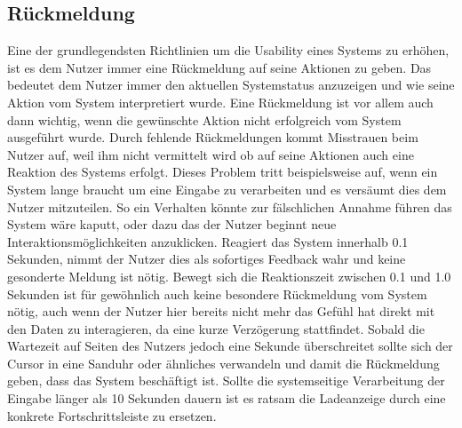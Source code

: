 \subsection*{Rückmeldung}

Eine der grundlegendsten Richtlinien um die Usability eines Systems zu erhöhen, ist es dem Nutzer immer eine Rückmeldung auf seine Aktionen zu geben.
Das bedeutet dem Nutzer immer den aktuellen Systemstatus anzuzeigen und wie seine Aktion vom System interpretiert wurde.
Eine Rückmeldung ist vor allem auch dann wichtig, wenn die gewünschte Aktion nicht erfolgreich vom System ausgeführt wurde.
Durch fehlende Rückmeldungen kommt Misstrauen beim Nutzer auf, weil ihm nicht vermittelt wird ob auf seine Aktionen auch eine Reaktion des Systems erfolgt\cite{Knight.2019c}.
Dieses Problem tritt beispielsweise auf, wenn ein System lange braucht um eine Eingabe zu verarbeiten und es versäumt dies dem Nutzer mitzuteilen.
So ein Verhalten könnte zur fälschlichen Annahme führen das System wäre kaputt, oder dazu das der Nutzer beginnt neue Interaktionsmöglichkeiten anzuklicken.
Reagiert das System innerhalb 0.1 Sekunden, nimmt der Nutzer dies als sofortiges Feedback wahr und keine gesonderte Meldung ist nötig.
Bewegt sich die Reaktionszeit zwischen 0.1 und 1.0 Sekunden ist für gewöhnlich auch keine besondere Rückmeldung vom System nötig, auch wenn der Nutzer hier bereits nicht mehr das Gefühl hat direkt mit den Daten zu interagieren, da eine kurze Verzögerung stattfindet.
Sobald die Wartezeit auf Seiten des Nutzers jedoch eine Sekunde überschreitet sollte sich der Cursor in eine Sanduhr oder ähnliches verwandeln und damit die Rückmeldung geben, dass das System beschäftigt ist.
Sollte die systemseitige Verarbeitung der Eingabe länger als 10 Sekunden dauern ist es ratsam die Ladeanzeige durch eine konkrete Fortschrittsleiste zu ersetzen\cite{Nielsen.1995?}.

